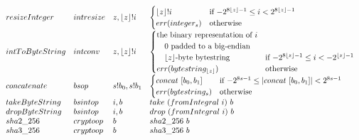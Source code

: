 \documentclass[../main.tex]{subfiles}
\begin{document}
\begin{figure*}[t]
\[\begin{array}{lllll}
        resizeInteger   &  intresize  &   z, \lfloor z \rfloor!i   & \begin{cases}
            \lfloor z \rfloor!i & \text{if $-2^{8\lfloor z \rfloor-1} \leq i < 2^{8\lfloor z \rfloor-1}$}\\
            err(integer_s) & \text{otherwise}\\
        \end{cases}\\
        
        intToByteString  &   intconv  &  z, \lfloor z \rfloor!i           & \begin{cases}
            \text{the binary representation of $i$} \\
            \quad\text{$0$ padded to a big-endian}\\
            \quad\text{$\lfloor z \rfloor$-byte bytestring}&\text{if $-2^{8\lfloor z \rfloor-1} \leq i < -2^{\lfloor z \rfloor-1}$}\\
            err(bytestring_{\lfloor z \rfloor}) & \text{otherwise}\\
        \end{cases}\\
        
        
        concatenate   &   bsop   &   s!b_0 , s!b_1   & \begin{cases}
            concat ~ [b_0,b_1] & \text{if $-2^{8s-1} \leq |concat ~ [b_0,b_1]| < 2^{8s-1}$}\\
            err(bytestring_s) & \text{otherwise}\\
        \end{cases}\\
        
        takeByteString    &   bsintop   &   i, b     & take ~ (fromIntegral ~ i) ~ b\\
        dropByteString    &   bsintop   &   i, b     & drop ~ (fromIntegral ~ i) ~ b\\
        
        sha2\_256         &  cryptoop  &   b           & sha2\_256 ~ b\\
        sha3\_256         &  cryptoop  &   b           & sha3\_256~ b\\
        

\end{array}\]
\end{figure*}
\end{document}
